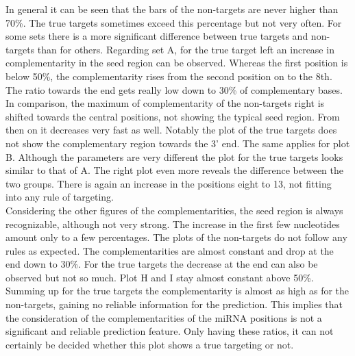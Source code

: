 \documentclass[11pt,  a4paper]{report}
\begin{document}
In general it can be seen that the bars of the non-targets are never higher than 70\%. The true targets sometimes exceed this percentage but not very often. For some sets there is a more significant difference between true targets and non-targets than for others. Regarding set A, for the true target left an increase in complementarity in the seed region can be observed. Whereas the first position is below 50\%, the complementarity rises from the second position on to the 8th. The ratio towards the end gets really low down to 30\% of complementary bases. In comparison, the maximum of complementarity of the non-targets right is shifted towards the central positions, not showing the typical seed region. From then on it decreases very fast as well. Notably the plot of the true targets does not show the complementary region towards the 3' end. The same applies for plot B. Although the parameters are very different the plot for the true targets looks similar to that of A. The right plot even more reveals the difference between the two groups. There is again an increase in the positions eight to 13, not fitting into any rule of targeting. \\

Considering the other figures of the complementarities, the seed region is always recognizable, although not very strong. The increase in the first few nucleotides amount only to a few percentages. The plots of the non-targets do not follow any rules as expected. The complementarities are almost constant and drop at the end down to 30\%. For the true targets the decrease at the end can also be observed but not so much. Plot H and I stay almost constant above 50\%.\\

Summing up for the true targets the complementarity is almost as high as for the non-targets, gaining no reliable information for the prediction. This implies that the consideration of the complementarities of the miRNA positions is not a significant and reliable prediction feature. Only having these ratios, it can not certainly be decided whether this plot shows a true targeting or not. \\
\end{document}
